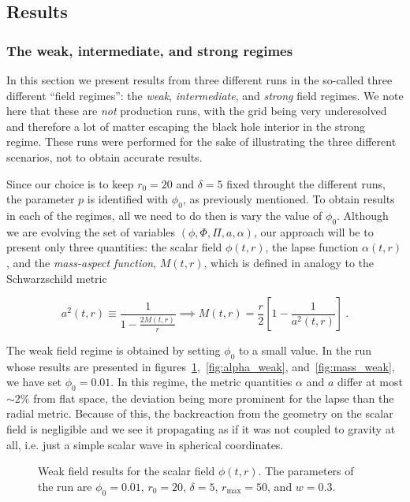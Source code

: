 \documentclass[a4paper,11pt]{article}
\renewcommand{\a}{\alpha}
\newcommand{\lrpar}[1]{\left( #1 \right)}
\newcommand{\lrsquare}[1]{\left[ #1 \right]}
\newcommand{\eq}[1]{
  \begin{equation}
    #1
  \end{equation}
}
\begin{document}
\subsection{Results}

\subsubsection{The weak, intermediate, and strong regimes}

In this section we present results from three different runs in the so-called three different ``field regimes'': the \emph{weak}, \emph{intermediate}, and \emph{strong} field regimes. We note here that these are \emph{not} production runs, with the grid being very underesolved and therefore a lot of matter escaping the black hole interior in the strong regime. These runs were performed for the sake of illustrating the three different scenarios, not to obtain accurate results.

Since our choice is to keep $r_{0}=20$ and $\delta=5$ fixed throught the different runs, the parameter $p$ is identified with $\phi_{0}$, as previously mentioned. To obtain results in each of the regimes, all we need to do then is vary the value of $\phi_{0}$. Although we are evolving the set of variables $\lrpar{\phi,\Phi,\Pi,a,\a}$, our approach will be to present only three quantities: the scalar field $\phi(t,r)$, the lapse function $\a(t,r)$, and the \emph{mass-aspect function}, $M(t,r)$, which is defined in analogy to the Schwarzschild metric

\eq{a^{2}(t,r) \equiv \frac{1}{1 - \frac{2M(t,r)}{r}} \implies M(t,r) = \frac{r}{2}\lrsquare{1 - \frac{1}{a^{2}(t,r)}}\ .}

The weak field regime is obtained by setting $\phi_{0}$ to a small value. In the run whose results are presented in figures~\ref{fig:phi_weak},~\ref{fig:alpha_weak}, and~\ref{fig:mass_weak}, we have set $\phi_{0}=0.01$. In this regime, the metric quantities $\a$ and $a$ differ at most $\sim2\%$ from flat space, the deviation being more prominent for the lapse than the radial metric. Because of this, the backreaction from the geometry on the scalar field is negligible and we see it propagating as if it was not coupled to gravity at all, i.e. just a simple scalar wave in spherical coordinates.

\begin{figure}[ht]
  \centering
  
  \caption[Weak field results for the scalar field $\phi(t,r)$.]{Weak field results for the scalar field $\phi(t,r)$. The parameters of the run are $\phi_{0}=0.01$, $r_{0}=20$, $\delta=5$, $r_{\max}=50$, and $w=0.3$.}
  \label{fig:phi_weak}
\end{figure}
\end{document}

